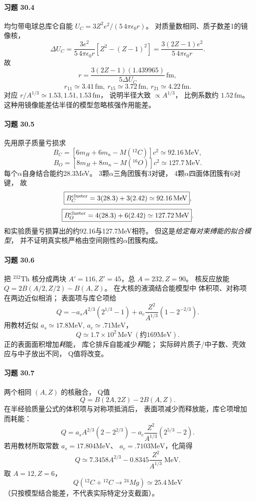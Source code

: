 \paragraph{习题 30.4}
均匀带电球总库仑自能
\(U_C=3Z^2e^2/(5\,4\pi\epsilon_0r)\)。
对质量数相同、质子数差1的镜像核，
\[
\Delta U_C=\frac{3e^2}{5\,4\pi\epsilon_0r}
[Z^2-(Z-1)^2]
=\frac{3(2Z-1)e^2}{5\,4\pi\epsilon_0r}.
\]
故
\[
\boxed{r=\frac{3(2Z-1)(1.439965)}
{5\Delta U_C}\,\mathrm{fm}},
\]
\[
\boxed{r_{11}\simeq3.41\,\mathrm{fm}},\
\boxed{r_{15}\simeq3.72\,\mathrm{fm}},\
\boxed{r_{21}\simeq4.22\,\mathrm{fm}}.
\]
对应 \(r/A^{1/3}\simeq1.53,1.51,1.53\,\mathrm{fm}\)，
说明半径大致 \(\propto A^{1/3}\)，
比例系数约 \(\boxed{1.52\,\mathrm{fm}}\)。
这种用镜像能差估半径的模型忽略核强作用能差。

\paragraph{习题 30.5}
先用原子质量亏损求
\[
B_C=[6m_H+6m_n-M({}^{12}C)]c^2
\simeq92.16\,\mathrm{MeV},
\]
\[
B_O=[8m_H+8m_n-M({}^{16}O)]c^2
\simeq127.7\,\mathrm{MeV}.
\]
每个\(\alpha\)自身结合能约28.3MeV。
3颗\(\alpha\)三角团簇有3对键，
4颗\(\alpha\)四面体团簇有6对键，
故
\[
\boxed{B_C^{\rm cluster}=3(28.3)+3(2.42)
\simeq92.16\,\mathrm{MeV}},
\]
\[
\boxed{B_O^{\rm cluster}=4(28.3)+6(2.42)
\simeq127.72\,\mathrm{MeV}}.
\]
和实验质量亏损算出的约92.16与127.7MeV相符。
但这是\emph{给定每对束缚能的拟合模型}，
并不证明真实核严格由空间刚性的\(\alpha\)团簇构成。

\paragraph{习题 30.6}
把 \({}^{232}\mathrm{Th}\) 核分成两块
\(A'=116,Z'=45\)，总 \(A=232,Z=90\)。
核反应放能
\(Q=2B(A/2,Z/2)-B(A,Z)\)。
在大核的液滴结合能模型中
体积项、对称项在两边近似相消；
表面项与库仑项给
\[
\boxed{Q
=-a_sA^{2/3}(2^{1/3}-1)
+a_c\frac{Z^2}{A^{1/3}}(1-2^{-2/3})}.
\]
用教材近似 \(a_s\simeq17.8\mathrm{MeV}\),
\(a_c\simeq.71\mathrm{MeV}\)，
\[
\boxed{Q\simeq1.7\times10^2\,\mathrm{MeV}
\ (\text{约169MeV})}.
\]
正的表面面积增加\emph{耗}能，
库仑排斥自能减少\emph{释}能；
实际碎片质子/中子数、壳效应与中子放出不同，
Q值将改变。

\paragraph{习题 30.7}
两个相同 \((A,Z)\) 的核融合，
Q值
\[
Q=B(2A,2Z)-2B(A,Z).
\]
在半经验质量公式的体积项与对称项抵消后，
表面项减少而释放能，库仑项增加而耗能：
\[
\boxed{Q=a_sA^{2/3}(2-2^{2/3})
-a_c\frac{Z^2}{A^{1/3}}(2^{5/3}-2)}.
\]
若用教材所取常数
\(a_s=17.804\mathrm{MeV}\)、
\(a_c=.7103\mathrm{MeV}\)，化简得
\[
\boxed{Q\simeq7.3458 A^{2/3}
-0.8345\frac{Z^2}{A^{1/3}}
\ \mathrm{MeV}}.
\]
取 \(A=12,Z=6\)，
\[
\boxed{Q({}^{12}C+{}^{12}C\to{}^{24}Mg)
\simeq25.4\,\mathrm{MeV}}
\]
（只按模型结合能差，不代表实际特定分支截面）。

